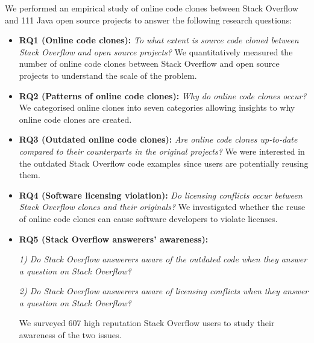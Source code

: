 \documentclass[10pt,journal,compsoc]{IEEEtran}
\begin{document}
We performed an empirical study of online code clones between Stack
Overflow and 111 Java open source projects to answer the following
research questions:
\begin{itemize}
	\item \textbf{RQ1 (Online code clones): }\textit{To what extent is source
		code cloned between Stack Overflow and open source projects?} We
	quantitatively measured the number of online code clones between Stack
	Overflow and open source projects to understand the scale of the
	problem. 
	\item \textbf{RQ2 (Patterns of online code clones): }\textit{Why do online
		code clones occur?} We categorised online clones into seven
	categories allowing insights to why online code clones are created.
	\item \textbf{RQ3 (Outdated online code clones): }\textit{Are
		online code clones up-to-date compared to their counterparts in the
		original projects?} We were interested in the outdated Stack
	Overflow code examples since users are potentially reusing
	them. 
	\item \textbf{RQ4 (Software licensing violation): }\textit{Do
		licensing conflicts occur between Stack Overflow clones and their
		originals?} We investigated whether the reuse of online code clones
	can cause software developers to violate licenses.
	\item \textbf{RQ5 (Stack Overflow answerers' awareness): }
	
	\textit{1) Do Stack Overflow
		answerers aware of the outdated code when
		they answer a question on Stack Overflow?} 
	
	\textit{2) Do Stack Overflow
			answerers aware of licensing conflicts when
			they answer a question on Stack Overflow?} 
	
	We surveyed 607 high reputation Stack Overflow users to study their
	awareness of the two issues.
\end{itemize}
\end{document}
